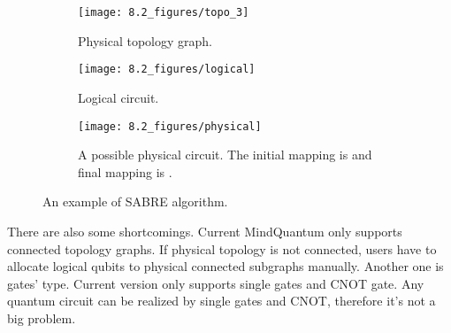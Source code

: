 \begin{figure}
	\centering
	\begin{subfigure}{0.1\textwidth}
		\texttt{[image: 8.2\_figures/topo\_3]}
		\caption{Physical topology graph.}
		\label{fig:qubit-mapping-physical-topo}
	\end{subfigure}
	\begin{subfigure}{0.35\textwidth}
		\texttt{[image: 8.2\_figures/logical]}
		\caption{Logical circuit.}
		\label{fig:qubit-mapping-logical-circuit}
	\end{subfigure}
	\begin{subfigure}{0.45\textwidth}
		\texttt{[image: 8.2\_figures/physical]}
		\caption{A possible physical circuit. The initial mapping is \code{[3, 2, 0, 1]} and final mapping is \code{[1, 2, 0, 3]}.}
		\label{fig:qubit-mapping-physical-circuit}
	\end{subfigure}

	\caption{An example of SABRE algorithm.}
\end{figure}

There are also some shortcomings. Current MindQuantum only supports connected topology graphs. If physical topology is not connected, users have to allocate logical qubits to physical connected subgraphs manually.
Another one is gates' type. Current version only supports single gates and CNOT gate. Any quantum circuit can be realized by single gates and CNOT, therefore it's not a big problem.

